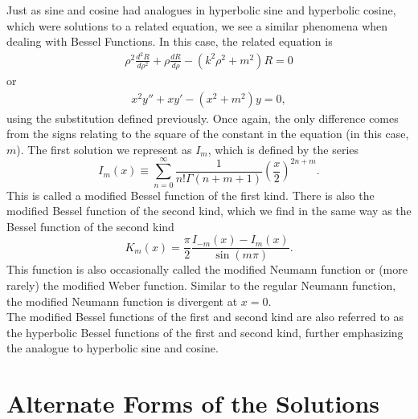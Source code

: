 \documentclass[11pt]{report}
\newcommand{\fpar}[1]{\left({#1}\right)}
\begin{document}
Just as sine and cosine had analogues in hyperbolic sine and hyperbolic cosine, which were solutions to a related equation, we see a similar phenomena when dealing with Bessel Functions. In this case, the related equation is 
    \begin{align}
        \rho^2\frac{d^2 R}{d\rho^2}+\rho\frac{dR}{d\rho}-\fpar{k^2\rho^2+m^2}R=0
    \end{align}
or
    \begin{align}
        x^2y''+xy'-(x^2+m^2)y = 0,
    \end{align}
using the substitution defined previously. Once again, the only difference comes from the signs relating to the square of the constant in the equation (in this case, $m$). The first solution we represent as $I_m$, which is defined by the series
    \begin{equation}
        I_m(x)\equiv\sum_{n=0}^\infty\frac{1}{n!\Gamma\fpar{n+m+1}}\fpar{\frac{x}{2}}^{2n+m}.
    \end{equation}
This is called a modified Bessel function of the first kind. There is also the modified Bessel function of the second kind, which we find in the same way as the Bessel function of the second kind
    \begin{equation}
        K_m(x)  =  \frac{\pi}{2}\frac{I_{-m}(x)-I_m(x)}{\sin\fpar{m\pi}}   . 
    \end{equation}
This function is also occasionally called the modified Neumann function or (more rarely) the modified Weber function. Similar to the regular Neumann function, the modified Neumann function is divergent at $x=0$.\\

The modified Bessel functions of the first and second kind are also referred to as the hyperbolic Bessel functions of the first and second kind, further emphasizing the analogue to hyperbolic sine and cosine.



\section{Alternate Forms of the Solutions}

\end{document}
